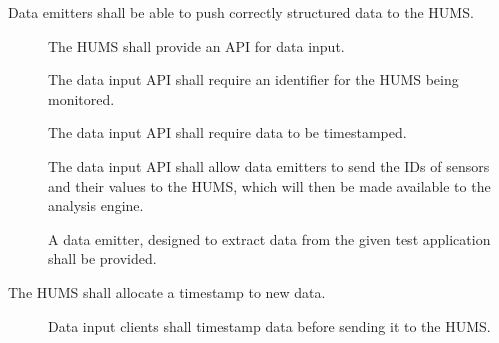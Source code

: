 \begin{description}[leftmargin=1.3cm, itemsep=0.3cm]
  	\item[\fr{1}]  Data emitters shall be able to push correctly structured data 	to the HUMS.
	\begin{description}
		 \item[] The HUMS shall provide an API for data input.

		  \item[] The data input API shall require an identifier for
 		 the HUMS being monitored.

 		 \item[] The data input API shall require data to be
 		 timestamped.

 		 \item[] The data input API shall allow data emitters
 		 to send the IDs of sensors and their values to the HUMS, which will 		then be made available to the analysis engine.

 		 \item[] A data emitter, designed to extract data from the given 		test application shall be provided.
	\end{description}
	\item[\fr{2}]  The HUMS shall allocate a timestamp to new data.
	\begin{description}
	 	 \item[]Data input clients shall timestamp data before
 		sending it to the HUMS.
		

\end{description}
\end{description}
